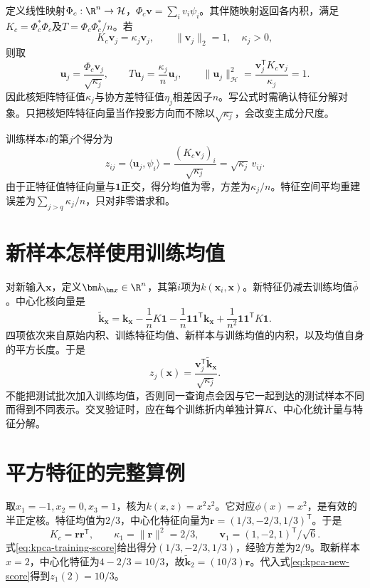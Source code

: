 定义线性映射$\Phi_c:\R^n\to\mathcal H$，$\Phi_c\bm v=\sum_i v_i\psi_i$。其伴随映射返回各内积，满足$K_c=\Phi_c^*\Phi_c$及$T=\Phi_c\Phi_c^*/n$。若
\begin{equation}
 K_c\bm v_j=\kappa_j\bm v_j,\qquad
 \|\bm v_j\|_2=1,\quad\kappa_j>0,
\end{equation}
则取
\begin{equation}
 \bm u_j=\frac{\Phi_c\bm v_j}{\sqrt{\kappa_j}},\qquad
 T\bm u_j=\frac{\kappa_j}{n}\bm u_j,
 \qquad \|\bm u_j\|_{\mathcal H}^2
 =\frac{\bm v_j^{\mathsf T}K_c\bm v_j}{\kappa_j}=1.
 \label{eq:kpca-normalized-direction}
\end{equation}
因此核矩阵特征值$\kappa_j$与协方差特征值$\eta_j$相差因子$n$。写公式时需确认特征分解对象。只把核矩阵特征向量当作投影方向而不除以$\sqrt{\kappa_j}$，会改变主成分尺度。

训练样本$i$的第$j$个得分为
\begin{equation}
 z_{ij}=\langle\bm u_j,\psi_i\rangle
 =\frac{(K_c\bm v_j)_i}{\sqrt{\kappa_j}}
 =\sqrt{\kappa_j}\,v_{ij}.
 \label{eq:kpca-training-score}
\end{equation}
由于正特征值特征向量与$\bm1$正交，得分均值为零，方差为$\kappa_j/n$。特征空间平均重建误差为$\sum_{j>q}\kappa_j/n$，只对非零谱求和。

\section{新样本怎样使用训练均值}
对新输入$\bm x$，定义$\bm k_{\bm x}\in\R^n$，其第$i$项为$k(\bm x_i,\bm x)$。新特征仍减去训练均值$\bar\phi$。中心化核向量是
\begin{equation}
 \tilde{\bm k}_{\bm x}=\bm k_{\bm x}-\frac1nK\bm1
 -\frac1n\bm1\bm1^{\mathsf T}\bm k_{\bm x}
 +\frac1{n^2}\bm1\bm1^{\mathsf T}K\bm1.
 \label{eq:kpca-test-centering}
\end{equation}
四项依次来自原始内积、训练特征均值、新样本与训练均值的内积，以及均值自身的平方长度。于是
\begin{equation}
 z_j(\bm x)=\frac{\bm v_j^{\mathsf T}\tilde{\bm k}_{\bm x}}{\sqrt{\kappa_j}}.
 \label{eq:kpca-new-score}
\end{equation}
不能把测试批次加入训练均值，否则同一查询点会因与它一起到达的测试样本不同而得到不同表示。交叉验证时，应在每个训练折内单独计算$K$、中心化统计量与特征分解。

\section{平方特征的完整算例}
取$x_1=-1,x_2=0,x_3=1$，核为$k(x,z)=x^2z^2$。它对应$\phi(x)=x^2$，是有效的半正定核。特征均值为$2/3$，中心化特征向量为$\bm r=(1/3,-2/3,1/3)^{\mathsf T}$。于是
\begin{equation}
 K_c=\bm r\bm r^{\mathsf T},\qquad
 \kappa_1=\|\bm r\|^2=2/3,\qquad
 \bm v_1=(1,-2,1)^{\mathsf T}/\sqrt6.
\end{equation}
式\eqref{eq:kpca-training-score}给出得分$(1/3,-2/3,1/3)$，经验方差为$2/9$。取新样本$x=2$，中心化特征为$4-2/3=10/3$，故$\tilde{\bm k}_{2}=(10/3)\bm r$。代入式\eqref{eq:kpca-new-score}得到$z_1(2)=10/3$。

